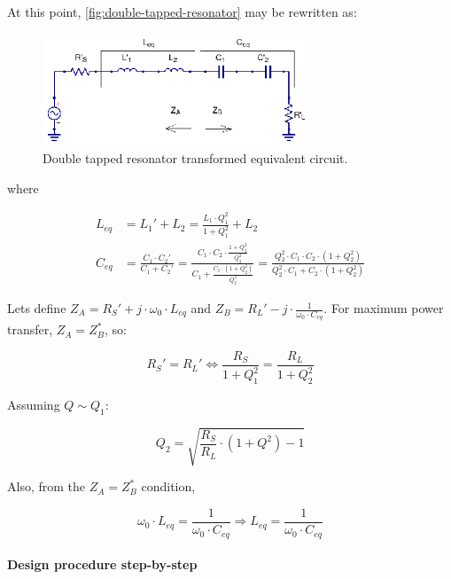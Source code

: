 \noindent At this point, \ref{fig:double-tapped-resonator} may be rewritten as:

\begin{figure}[H]
\centering
\includegraphics[width=80mm]{./images/Synthesis/Impedance_Matching/Double-Tapped-Resonator-Transformed}
\caption{Double tapped resonator transformed equivalent circuit.}
\label{fig:double-tapped-resonator-transformed}
\end{figure}

\noindent where

\begin{align}
  L_{eq} &= L_1' + L_2 = \frac{L_1 \cdot Q_1^2}{1 + Q_1^2} + L_2\\
  C_{eq} &= \frac{C_1 \cdot C_2'}{C_1 + C_2'} = \frac{C_1 \cdot C_2 \cdot \frac{1 + Q_2^2}{Q_2^2}}{C_1 + \frac{C_2 \cdot (1 + Q_2^2)}{Q_2^2}} = \frac{Q_2^2 \cdot C_1 \cdot C_2 \cdot (1 + Q_2^2)}{Q_2^2 \cdot C_1 + C_2 \cdot (1 + Q_2^2)}
\end{align}

\noindent Lets define $Z_A = R_S' + j \cdot \omega_0 \cdot L_{eq}$ and $Z_B = R_L' - j \cdot \frac{1}{\omega_0 \cdot C_{eq}}$. For maximum power transfer, $Z_A = Z_B^*$, so:

\begin{equation}
R_S' = R_L' \Longleftrightarrow   \frac{R_S}{1 + Q_1^2} = \frac{R_L}{1 + Q_2^2}
\end{equation}

\noindent Assuming $Q \sim Q_1$:

\begin{equation}
Q_2 = \sqrt{\frac{R_S}{R_L} \cdot \left(1 + Q^2\right) - 1}
\end{equation}

\noindent Also, from the $Z_A = Z_B^*$ condition,

\begin{equation}
\omega_0 \cdot L_{eq} = \frac{1}{\omega_0 \cdot C_{eq}} \Longrightarrow L_{eq} = \frac{1}{\omega_0 \cdot C_{eq}} 
\end{equation}

\paragraph{Design procedure step-by-step}

